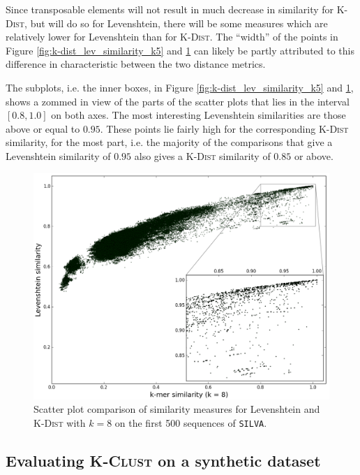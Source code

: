 Since transposable elements will not result in much decrease in similarity for
\textsc{K-Dist}, but will do so for Levenshtein, there will be some measures
which are relatively lower for Levenshtein than for \textsc{K-Dist}. The
``width'' of the points in Figure \ref{fig:k-dist_lev_similarity_k5} and
\ref{fig:k-dist_lev_similarity_k8} can likely be partly attributed to this
difference in characteristic between the two distance metrics.

The subplots, i.e. the inner boxes, in Figure
\ref{fig:k-dist_lev_similarity_k5} and \ref{fig:k-dist_lev_similarity_k8},
shows a zommed in view of the parts of the scatter plots that lies in the
interval $[0.8,1.0]$ on both axes. The most interesting Levenshtein
similarities are those above or equal to $0.95$. These points lie fairly high
for the corresponding \textsc{K-Dist} similarity, for the most part, i.e. the
majority of the comparisons that give a Levenshtein similarity of $0.95$ also
gives a \textsc{K-Dist} similarity of $0.85$ or above.

\begin{figure}[H]
  \includegraphics[width=1.0\textwidth]{graphics/Levenshtein_K-Dist_k8.png}
  \caption{Scatter plot comparison of similarity measures for Levenshtein and
    \textsc{K-Dist} with $k=8$ on the first 500 sequences of \texttt{SILVA}.}
  \label{fig:k-dist_lev_similarity_k8}
\end{figure}


\subsection{Evaluating \textsc{K-Clust} on a synthetic dataset}
\label{sec:synth_dataset}

